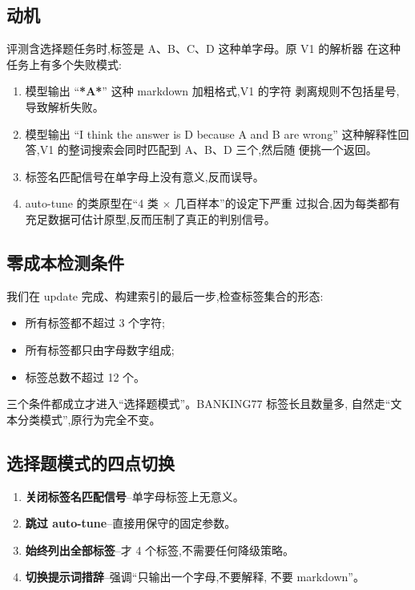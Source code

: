 \documentclass[10pt,twocolumn,letterpaper]{article}
\begin{document}
\subsection{动机}
评测含选择题任务时,标签是 A、B、C、D 这种单字母。原 V1 的解析器
在这种任务上有多个失败模式:
\begin{enumerate}[leftmargin=*,itemsep=1pt,topsep=2pt]
\item 模型输出 ``\textbf{*A*}'' 这种 markdown 加粗格式,V1 的字符
  剥离规则不包括星号,导致解析失败。
\item 模型输出 ``I think the answer is D because A and B are wrong''
  这种解释性回答,V1 的整词搜索会同时匹配到 A、B、D 三个,然后随
  便挑一个返回。
\item 标签名匹配信号在单字母上没有意义,反而误导。
\item auto-tune 的类原型在``4 类 $\times$ 几百样本''的设定下严重
  过拟合,因为每类都有充足数据可估计原型,反而压制了真正的判别信号。
\end{enumerate}

\subsection{零成本检测条件}
我们在 update 完成、构建索引的最后一步,检查标签集合的形态:
\begin{itemize}[leftmargin=*,itemsep=1pt,topsep=2pt]
\item 所有标签都不超过 3 个字符;
\item 所有标签都只由字母数字组成;
\item 标签总数不超过 12 个。
\end{itemize}
三个条件都成立才进入``选择题模式''。BANKING77 标签长且数量多,
自然走``文本分类模式'',原行为完全不变。

\subsection{选择题模式的四点切换}
\begin{enumerate}[leftmargin=*,itemsep=2pt,topsep=2pt]
\item \textbf{关闭标签名匹配信号}--单字母标签上无意义。
\item \textbf{跳过 auto-tune}--直接用保守的固定参数。
\item \textbf{始终列出全部标签}--才 4 个标签,不需要任何降级策略。
\item \textbf{切换提示词措辞}--强调``只输出一个字母,不要解释,
  不要 markdown''。
\end{enumerate}
\end{document}
